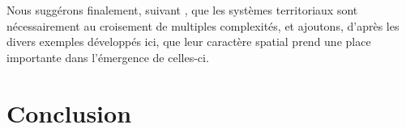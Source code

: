 \documentclass[11pt]{article}
\begin{document}
Nous suggérons finalement, suivant \cite{raimbault2017complexity}, que les systèmes territoriaux sont nécessairement au croisement de multiples complexités, et ajoutons, d'après les divers exemples développés ici, que leur caractère spatial prend une place importante dans l'émergence de celles-ci.


\section{Conclusion}











\end{document}

